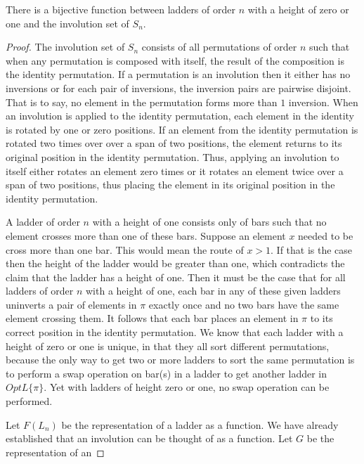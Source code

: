 \begin{theorem}
    There is a bijective function between ladders of order $n$ with a height of zero or one and the involution set of $S_{n}$.
\end{theorem}
\begin{proof}
    The involution set of $S_{n}$ consists of all permutations of order $n$ 
    such that when any permutation is composed with itself, the result of the composition is the identity permutation. 
    If a permutation is an involution then it either has no inversions or for each pair of inversions, the inversion pairs are pairwise disjoint. 
    That is to say, no element in the 
    permutation forms more than $1$ inversion. 
    When an involution is applied to the identity permutation, each element in the identity is 
    rotated by one or zero positions. 
    If an element from the identity permutation is rotated two times over over a span of two positions, 
    the element returns to its original position in the identity permutation.
    Thus, applying an involution to itself either rotates an element zero times or it rotates an element twice over a span of two positions, 
    thus placing the element in its 
    original position in the identity permutation.\par 
    A ladder of order $n$ with a height of one consists only of bars such that no element crosses more than one of these bars. 
    Suppose an element $x$
    needed to be cross more than one bar. This would mean the route of $x>1$. If that is the case then the height of the ladder would 
    be greater than one, which contradicts the claim that the ladder has a height of one.
    Then it must be the case that for all ladders of order $n$ with a height of one, each bar in any of these given ladders 
    uninverts a pair of elements in $\pi$ exactly once and no two bars 
    have the same element crossing them. It follows that each bar places an element in $\pi$ to its correct position 
    in the identity permutation.  
    We know that each ladder with a height of zero or one is unique, in that they all sort different permutations,
    because the only way to get 
    two or more ladders to sort the same permutation is to perform a swap operation on bar(s) in a ladder to get 
    another ladder in $OptL\{\pi\}$.
    Yet with ladders of height zero or one, no swap operation can be performed.\par
    Let $F(L_{n})$ be the representation of a ladder as a function. We have already established that an 
    involution can be thought of as a function. Let $G$ be the representation of an 

\end{proof}
